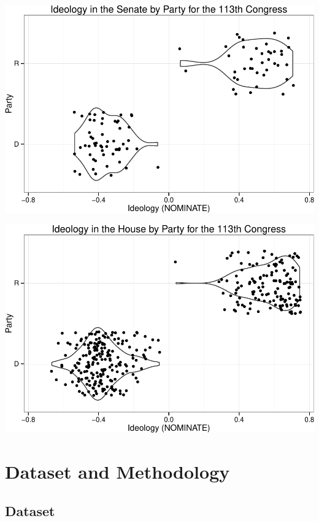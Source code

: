 \documentclass[12pt,twoside]{reedthesis}
\begin{document}
  \begin{center}\includegraphics{trautlein_thesis_files/figure-latex/violin_113_senate-1} \end{center}
  
  \begin{center}\includegraphics{trautlein_thesis_files/figure-latex/violin_113_house-1} \end{center}
  
  \chapter{Dataset and Methodology}\label{dataset-and-methodology}
  
  \section{Dataset}\label{dataset}
  
\end{document}

